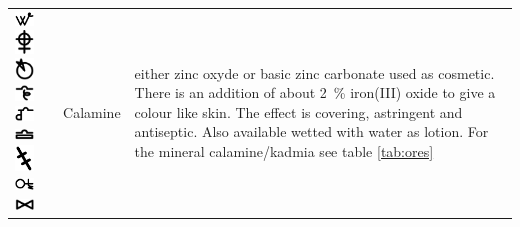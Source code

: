 \documentclass[british,final,landscape]{scrartcl}
\begin{document}
\begin{refsection}
\begin{supertabular}{p{0.3\textwidth}p{0.34\textwidth}p{0.34\textwidth}}
   \includegraphics[width=5mm]{Mixtures/Calamine} \includegraphics[width=5mm]{Mixtures/Calamine2} \includegraphics[width=5mm]{Mixtures/Calamine3} \includegraphics[width=5mm]{Mixtures/Calamine4} \includegraphics[width=5mm]{Mixtures/Calamine5} \includegraphics[width=5mm]{Mixtures/Calamine6} \includegraphics[width=5mm]{Mixtures/Calamine7} \includegraphics[width=5mm]{Mixtures/Calamine8} \includegraphics[width=5mm]{Mixtures/Calamine9} & Calamine & either zinc oxyde  or basic zinc carbonate  used as cosmetic. There is an addition of about \SI{2}{\%} iron(III) oxide to give a colour like skin. The effect is covering, astringent and antiseptic. Also available wetted with water as lotion. For the mineral calamine/kadmia see table \ref{tab:ores} \\

\end{supertabular}
\end{refsection}
\end{document}
